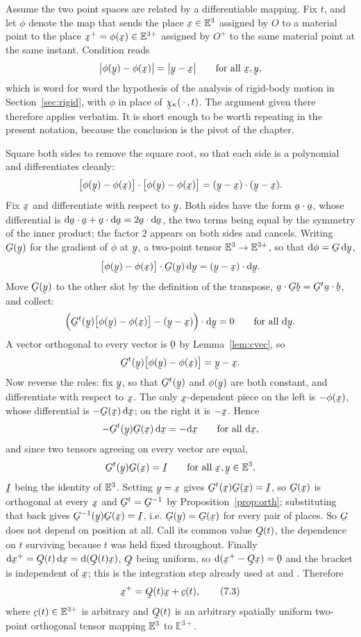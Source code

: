 Assume the two point spaces are related by a differentiable mapping. Fix
$t$, and let $\phi$ denote the map that sends the place $\bx\in\Et$
assigned by $O$ to a material point to the place
$\bx^{+}=\phi(\bx)\in\mathbb{E}^{3+}$ assigned by $O^{+}$ to the same
material point at the same instant. Condition  reads
\[
   \big|\phi(\by)-\phi(\bx)\big|=\big|\by-\bx\big|
   \qquad\text{for all }\bx,\by ,
\]
which is word for word the hypothesis  of the analysis of
rigid-body motion in Section~\ref{sec:rigid}, with $\phi$ in place of
$\bchi_{\kappa}(\,\cdot\,,t)$. The argument given there therefore applies
verbatim. It is short enough to be worth repeating in the present
notation, because the conclusion is the pivot of the chapter.

Square both sides to remove the square root, so that each side is a
polynomial and differentiates cleanly:
\[
   \ip{\big[\phi(\by)-\phi(\bx)\big]}{\big[\phi(\by)-\phi(\bx)\big]}
   =\ip{(\by-\bx)}{(\by-\bx)} .
\]
Fix $\bx$ and differentiate with respect to $\by$. Both sides have the
form $\ip\ba\ba$, whose differential is
$\ip{\dl\ba}\ba+\ip\ba{\dl\ba}=2\ip\ba{\dl\ba}$, the two terms being
equal by the symmetry of the inner product; the factor $2$ appears on
both sides and cancels. Writing $\bG(\by)$ for the gradient of $\phi$ at
$\by$, a two-point tensor $\mathbb{E}^{3}\to\mathbb{E}^{3+}$, so that
$\dl\phi=\bG\,\dl\by$,
\[
   \ip{\big[\phi(\by)-\phi(\bx)\big]}{\bG(\by)\,\dl\by}
   =\ip{(\by-\bx)}{\dl\by} .
\]
Move $\bG(\by)$ to the other slot by the definition of the transpose,
$\ip\ba{\bG\bb}=\ip{\bG^{t}\ba}\bb$, and collect:
\[
   \ip{\Big(\bG^{t}(\by)\big[\phi(\by)-\phi(\bx)\big]-(\by-\bx)\Big)}
      {\dl\by}=0\qquad\text{for all }\dl\by .
\]
A vector orthogonal to every vector is $\bze$ by Lemma~\ref{lem:cvec}, so
\[
   \bG^{t}(\by)\big[\phi(\by)-\phi(\bx)\big]=\by-\bx .
\]
Now reverse the roles: fix $\by$, so that $\bG^{t}(\by)$ and $\phi(\by)$
are both constant, and differentiate with respect to $\bx$. The only
$\bx$-dependent piece on the left is $-\phi(\bx)$, whose differential is
$-\bG(\bx)\,\dl\bx$; on the right it is $-\bx$. Hence
\[
   -\bG^{t}(\by)\bG(\bx)\,\dl\bx=-\dl\bx\qquad\text{for all }\dl\bx ,
\]
and since two tensors agreeing on every vector are equal,
\[
   \bG^{t}(\by)\bG(\bx)=\I\qquad\text{for all }\bx,\by\in\Et ,
\]
$\I$ being the identity of $\mathbb{E}^{3}$. Setting $\by=\bx$ gives
$\bG^{t}(\bx)\bG(\bx)=\I$, so $\bG(\bx)$ is orthogonal at every $\bx$ and
$\bG^{t}=\bG^{-1}$ by Proposition~\ref{prop:orth}; substituting that back
gives $\bG^{-1}(\by)\bG(\bx)=\I$, i.e. $\bG(\by)=\bG(\bx)$ for every pair
of places. So $\bG$ does not depend on position at all. Call its common
value $\bQ(t)$, the dependence on $t$ surviving because $t$ was held
fixed throughout. Finally $\dl\bx^{+}=\bQ(t)\,\dl\bx=\dl(\bQ(t)\bx)$,
$\bQ$ being uniform, so $\dl(\bx^{+}-\bQ\bx)=\bze$ and the bracket is
independent of $\bx$; this is the integration step already used at
 and . Therefore
\begin{equation}
   \bx^{+}=\bQ(t)\bx+\bc(t),
   \tag{7.3}\label{eq:7.3}
\end{equation}
where $\bc(t)\in\mathbb{E}^{3+}$ is arbitrary and $\bQ(t)$ is an
arbitrary spatially uniform two-point orthogonal tensor mapping $\mathbb{E}^{3}$ to
$\mathbb{E}^{3+}$.

